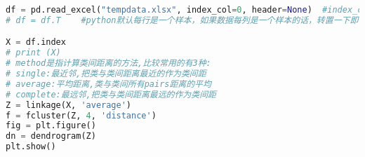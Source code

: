 \documentclass[withoutpreface,bwprint]{cumcmthesis} %
\begin{document}
\begin{appendices}
\begin{lstlisting}[language=python]
df = pd.read_excel("tempdata.xlsx", index_col=0, header=None)  #index_col=0指定数据中第一列是类别名称，PS：计算机程序一般从整数0开始计数，所以0就代表第一列
# df = df.T    #python默认每行是一个样本，如果数据每列是一个样本的话，转置一下即可

X = df.index
# print (X)
# method是指计算类间距离的方法,比较常用的有3种:
# single:最近邻,把类与类间距离最近的作为类间距
# average:平均距离,类与类间所有pairs距离的平均
# complete:最远邻,把类与类间距离最远的作为类间距
Z = linkage(X, 'average')
f = fcluster(Z, 4, 'distance')
fig = plt.figure()
dn = dendrogram(Z)
plt.show()

 \end{lstlisting}
\end{appendices}
\end{document}
